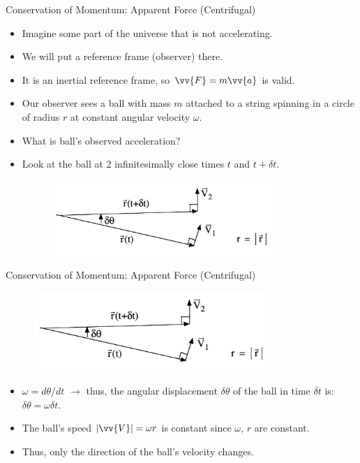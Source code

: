 \begin{frame}{Conservation of Momentum: Apparent Force (Centrifugal)}
\begin{itemize}
	\item Imagine some part of the universe that is not accelerating. 
	\item We will put a reference frame (observer) there.
	\item It is an inertial reference frame, so $\vv{F} = m\vv{a}$ is valid.
	\item Our observer sees a ball with mass $m$ attached to a string spinning in a circle of radius $r$ at constant angular velocity $\omega$. 
	\item What is ball's observed acceleration?
	\item Look at the ball at 2 infinitesimally close times $t$ and $t+\delta t$.
	\begin{figure}
		\includegraphics[width=0.8\textwidth]{centrifugal1}	
	\end{figure}
\end{itemize}
\end{frame}
\begin{frame}{Conservation of Momentum: Apparent Force (Centrifugal)}
\begin{figure}
		\includegraphics[width=0.8\textwidth]{centrifugal1}	
	\end{figure}
\begin{itemize}
	\item $\omega = d\theta / dt$ $\rightarrow$ thus, the angular displacement $\delta \theta$ of the ball in time $\delta t$ is: $\delta \theta = \omega \delta t$. 
	\item The ball's speed $\left|\vv{V}\right| = \omega r$ is constant since $\omega$, $r$ are constant.
	\item Thus, only the direction of the ball's velocity changes.
\end{itemize}
\end{frame}
